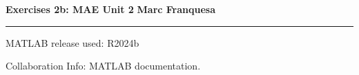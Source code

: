 \documentclass[a4paper,12pt]{report}
\begin{document}
{\Large{\textbf{Exercises 2b: MAE Unit 2}} \hfill \textbf{Marc Franquesa}}
\hrule
\vspace{0.5cm}

MATLAB release used: R2024b

Collaboration Info: MATLAB documentation.

\bigskip

\begin{exlist}
    
\end{exlist}
\end{document}

